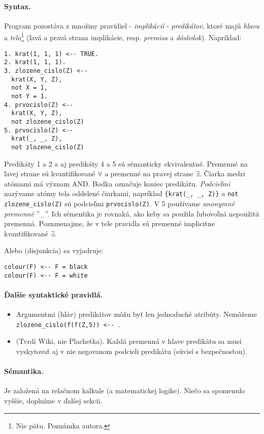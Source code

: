 \documentclass[10pt,a4paper]{article}
\begin{document}
\paragraph{Syntax.}
Program pozostáva z množiny pravidiel - \emph{implikácií} - \emph{predikátov}, ktoré majú \emph{hlavu} a \emph{telo}\footnote{
Nie pätu. Poznámka autora. 
} (ľavá a pravá strana implikácie, resp. \emph{premisa} a \emph{dôsledok}). 
Napríklad:
\begin{verbatim}
1. krat(1, 1, 1) <-- TRUE.
2. krat(1, 1, 1).
3. zlozene_cislo(Z) <--
  krat(X, Y, Z),
  not X = 1,
  not Y = 1.
4. prvocislo(Z) <--
  krat(X, Y, Z),
  not zlozene_cislo(Z)
5. prvocislo(Z) <--
  krat(_, _, Z),
  not zlozene_cislo(Z)
\end{verbatim} 
Predikáty 1 a 2 a aj predikáty 4 a 5 sú sémanticky ekvivalentné. Premenné
na ľavej strane sú kvantifikované $\forall$ a premenné na pravej strane
$\exists$. Čiarka medzi atómami má význam AND. Bodka označuje koniec
predikátu. \emph{Podcieľmi} nazývame atómy tela oddelené čiarkami, napríklad 
  \verb|{krat(_, _, Z)}| a \verb|not zlozene_cislo(Z)| sú podcieľmi \verb|prvocislo(Z)|. 
V 5 používame \emph{anonymné premenné} ''\_''. Ich sémentika je rovnaká, ako keby sa použila ľubovoľná nepoužitá premenná. Poznmenajme, že v tele pravidla sú premenné implicitne kvantifikované $\exists$.
  
Alebo (disjunkcia) sa vyjadruje:
\begin{verbatim}
colour(F) <-- F = black
colour(F) <-- F = white
\end{verbatim} 
  
\paragraph{Ďalšie syntaktické pravidlá.}

\begin{itemize}
\item Argumentmi (hláv) predikátov môžu byť len jednoduché atribúty. Nemôžeme \verb|zlozene_cislo(f(f(Z,5)) <-- |. 
\item (Tvrdí Wiki, nie Plachetka). Každá premenná v hlave predikátu sa musí vyskytovať aj v nie negovanom podcieli predikátu (súvisí s bezpečnosťou). 
\end{itemize}

\paragraph{Sémantika.}
Je založená na relačnom kalkule (a matematickej logike). 
Niečo sa spomenulo vyššie, doplníme v ďalšej sekcii.
\end{document}

